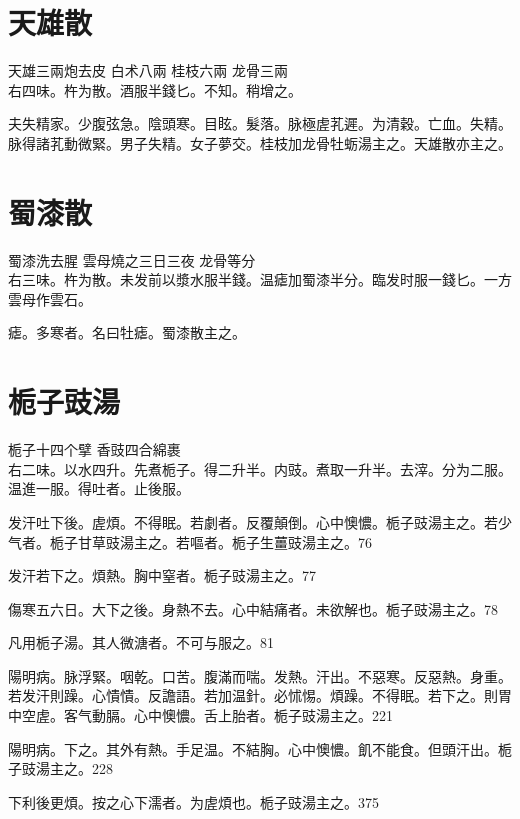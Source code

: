 \section{天雄散}

天雄{\scriptsize 三兩炮去皮} 白术{\scriptsize 八兩} 桂枝{\scriptsize 六兩} 龙骨{\scriptsize 三兩}\\
右四味。杵为散。酒服半錢匕。不知。稍增之。

夫失精家。少腹弦急。陰頭寒。目眩。髮落。脉極虗芤遲。为清穀。亡血。失精。脉得諸芤動微緊。男子失精。女子夢交。桂枝加龙骨牡蛎湯主之。天雄散亦主之。

\section{蜀漆散}

蜀漆{\scriptsize 洗去腥} 雲母{\scriptsize 燒之三日三夜} 龙骨{\scriptsize 等分}\\
右三味。杵为散。未发前以漿水服半錢。温瘧加蜀漆半分。臨发时服一錢匕。{\scriptsize 一方雲母作雲石。}

瘧。多寒者。名曰牡瘧。蜀漆散主之。

\section{栀子豉湯}

栀子{\scriptsize 十四个擘} 香豉{\scriptsize 四合綿裹}\\
右二味。以水四升。先煮栀子。得二升半。内豉。煮取一升半。去滓。分为二服。温進一服。得吐者。止後服。

发汗吐下後。虗煩。不得眠。若劇者。反覆顛倒。心中懊憹。栀子{\khaai 豉}湯主之。若少气者。栀子甘草{\khaai 豉}湯主之。若嘔者。栀子生薑{\khaai 豉}湯主之。76

发汗若下之。煩熱。胸中窒者。栀子{\khaai 豉}湯主之。77

傷寒五六日。大下之後。身熱不去。心中結痛者。未欲解也。栀子{\khaai 豉}湯主之。78

凡用栀子湯。其人微溏者。不可与服之。81

陽明病。脉浮緊。咽乾。口苦。腹滿而喘。发熱。汗出。不惡寒。反惡熱。身重。若发汗則躁。心憒憒。反譫語。若加温針。必怵惕。煩躁。不得眠。若下之。則胃中空虗。客气動膈。心中懊憹。舌上胎者。栀子{\khaai 豉}湯主之。221

陽明病。下之。其外有熱。手足温。不結胸。心中懊憹。飢不能食。但頭汗出。栀子{\khaai 豉}湯主之。228

下利後更煩。按之心下濡者。为虗煩也。栀子{\khaai 豉}湯主之。375

